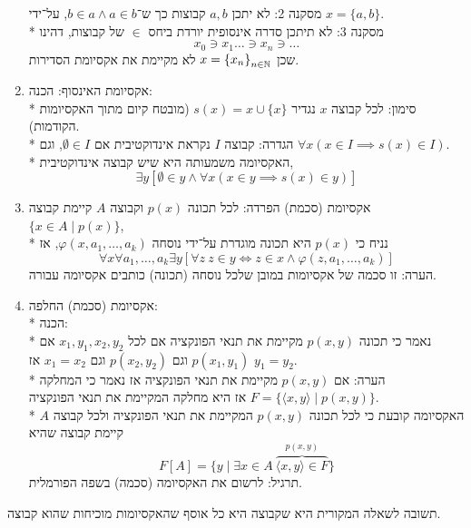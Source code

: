 \begin{definition}[המערכת ZF]
\begin{enumerate}
			מסקנה 2: לא יתכן $a, b$ קבוצות כך ש־$b \in a \land a \in b$, על־ידי $x = \{a, b\}$. \\*
			מסקנה 3: לא תיתכן סדרה אינסופית יורדת ביחס $\in$ של קבוצות, דהינו
			\[
				x_0 \ni x_1 \dots \ni x_n \ni \dots
			\]
			שכן $x = {\{ x_n \}}_{n \in \mathbb{N}}$ לא מקיימת את אקסיומת הסדירות.
		\item אקסיומת האינסוף:
			הכנה: \\*
			סימון: לכל קבוצה $x$ נגדיר $s(x) = x \cup \{ x \}$ (מובטח קיום מתוך האקסיומות הקודמות). \\*
			הגדרה: קבוצה $I$ נקראת אינדוקטיבית אם $\emptyset \in I$, וגם $\forall x (x \in I \implies s(x) \in I)$. \\*
			האקסיומה משמעותה היא שיש קבוצה אינדוקטיבית,
			\[
				\exists y [ \emptyset \in y \land \forall x (x \in y \implies s(x) \in y)]
			\]
		\item אקסיומת (סכמת) הפרדה:
			לכל תכונה $p(x)$ וקבוצה $A$ קיימת קבוצה $\{ x \in A \mid p(x) \}$, \\*
			נניח כי $p(x)$ היא תכונה מוגדרת על־ידי נוסחה $\varphi(x, a_1, \dots, a_k)$, אז
			\[
				\forall x \forall a_1, \dots, a_k \exists y [\forall z \ z \in y \iff z \in x \land \varphi(z, a_1, \dots, a_k)]
			\]
			הערה: זו סכמה של אקסיומות במובן שלכל נוסחה (תכונה) כותבים אקסיומה עבורה.
		\item אקסיומת (סכמת) החלפה: \\*
			הכנה: \\*
			נאמר כי תכונה $p(x, y)$ מקיימת את תנאי הפונקציה אם לכל $x_1, y_1, x_2, y_2$ אם $p(x_1, y_1)$ וגם $p(x_2, y_2)$ וגם $x_1 = x_2$ אז $y_1 = y_2$. \\*
			הערה: אם $p(x, y)$ מקיימת את תנאי הפונקציה אז נאמר כי המחלקה $F = \{ \langle x, y \rangle \mid p(x, y) \}$ אז היא מחלקה המקיימת את תנאי הפונקציה. \\*
			האקסיומה קובעת כי לכל תכונה $p(x, y)$ המקיימת את תנאי הפונקציה ולכל קבוצה $A$ קיימת קבוצה שהיא
			\[
				F[A] = \{ y \mid \exists x \in A\ \overbrace{\langle x, y \rangle \in F}^{p(x, y)} \}
			\]
			תרגיל: לרשום את האקסיומה (סכמה) בשפה הפורמלית.
	\end{enumerate}
\end{definition}
תשובה לשאלה המקורית היא שקבוצה היא כל אוסף שהאקסיומות מוכיחות שהוא קבוצה.

